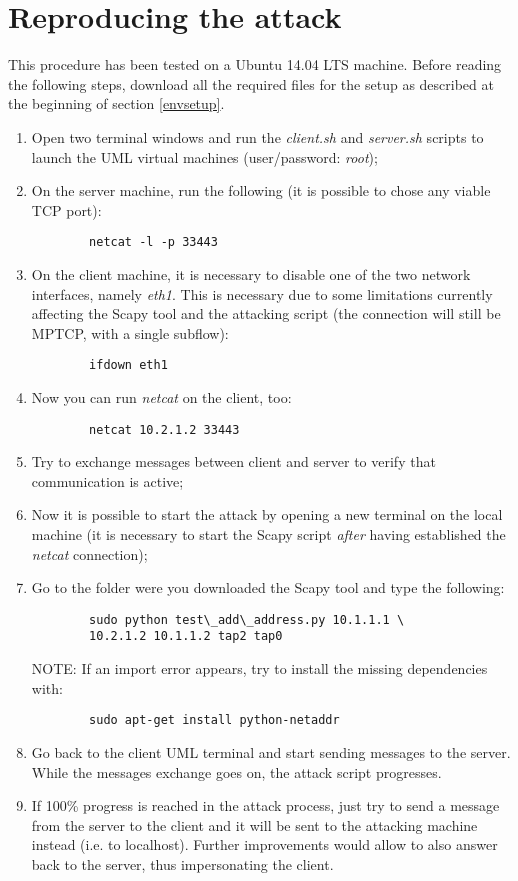\section{Reproducing the attack}
\label{reprattack}
This procedure has been tested on a Ubuntu 14.04 LTS machine. Before reading the following steps, download all the required files for the setup as described at the beginning of section \ref{envsetup}.

\begin{enumerate}
\item
    Open two terminal windows and run the \textit{client.sh} and \textit{server.sh} scripts to launch the UML virtual machines (user/password: \textit{root});
\item
    On the server machine, run the following (it is possible to chose any viable TCP port):
\begin{verbatim}
        netcat -l -p 33443
\end{verbatim}
\item
    On the client machine, it is necessary to disable one of the two network interfaces, namely \textit{eth1}. This is necessary due to some limitations currently affecting the Scapy tool and the attacking script (the connection will still be MPTCP, with a single subflow):
\begin{verbatim}
        ifdown eth1
\end{verbatim}
\item
    Now you can run \textit{netcat} on the client, too:
\begin{verbatim}
        netcat 10.2.1.2 33443
\end{verbatim}
\item
    Try to exchange messages between client and server to verify that communication is active;
\item
    Now it is possible to start the attack by opening a new terminal on the local machine (it is necessary to start the Scapy script \textit{after} having established the \textit{netcat} connection);
\item
    Go to the folder were you downloaded the Scapy tool and type the following:
\begin{verbatim}
        sudo python test\_add\_address.py 10.1.1.1 \
        10.2.1.2 10.1.1.2 tap2 tap0
\end{verbatim}
    NOTE: If an import error appears, try to install the missing dependencies with:
\begin{verbatim}
        sudo apt-get install python-netaddr
\end{verbatim}
\item
    Go back to the client UML terminal and start sending messages to the server. While the messages exchange goes on, the attack script progresses. 
\item
    If 100\% progress is reached in the attack process, just try to send a message from the server to the client and it will be sent to the attacking machine instead (i.e. to localhost). Further improvements would allow to also answer back to the server, thus impersonating the client.
\end{enumerate} 

